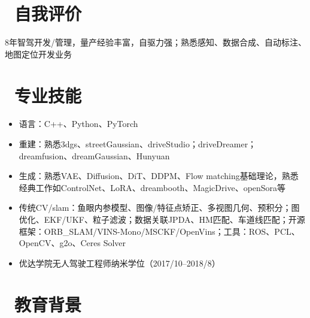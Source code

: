 \documentclass{resume}
\begin{document}




\section{\faBook\ 自我评价}
8年智驾开发/管理，量产经验丰富，自驱力强；熟悉感知、数据合成、自动标注、地图定位开发业务

\section{\faCogs\ 专业技能}
\begin{itemize}[parsep=0.5ex]
  \item 语言：C++、Python、PyTorch
  \item 重建：熟悉3dgs、streetGaussian、driveStudio；driveDreamer；dreamfusion、dreamGaussian、Hunyuan
  \item 生成：熟悉VAE、Diffusion、DiT、DDPM、Flow matching基础理论，熟悉经典工作如ControlNet、LoRA、dreambooth、MagicDrive、openSora等
  \item 传统CV/slam：鱼眼内参模型、图像/特征点矫正、多视图几何、预积分；图优化、EKF/UKF、粒子滤波；数据关联JPDA、HM匹配、车道线匹配；开源框架：ORB\_SLAM/VINS-Mono/MSCKF/OpenVins；工具：ROS、PCL、OpenCV、g2o、Ceres Solver
  \item 优达学院无人驾驶工程师纳米学位（2017/10--2018/8）
\end{itemize}

\section{\faGraduationCap\  教育背景}
\end{document}
